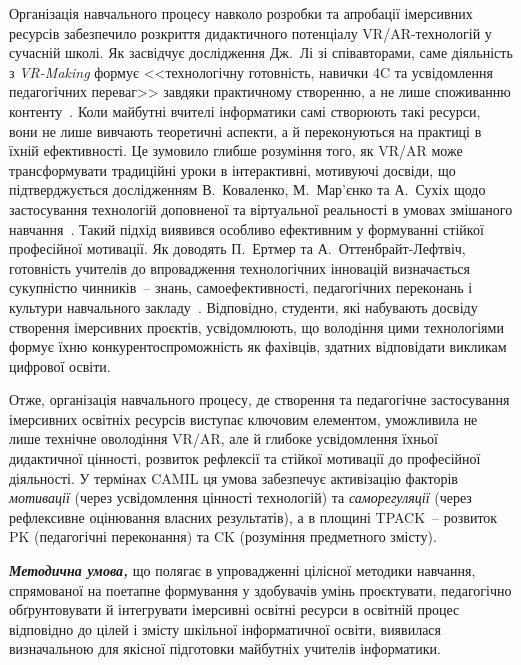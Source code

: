 Організація навчального процесу навколо розробки та апробації імерсивних ресурсів забезпечило розкриття дидактичного потенціалу VR/AR-технологій у сучасній школі. Як засвідчує дослідження Дж.~Лі зі співавторами, саме діяльність з \emph{VR-Making} формує <<технологічну готовність, навички 4C та усвідомлення педагогічних переваг>> завдяки практичному створенню, а не лише споживанню контенту~\cite{Lee2022VRMaking}. Коли майбутні вчителі інформатики самі створюють такі ресурси, вони не лише вивчають теоретичні аспекти, а й переконуються на практиці в їхній ефективності. Це зумовило глибше розуміння того, як VR/AR може трансформувати традиційні уроки в інтерактивні, мотивуючі досвіди, що підтверджується дослідженням В.~Коваленко, М.~Мар'єнко та А.~Сухіх щодо застосування технологій доповненої та віртуальної реальності в умовах змішаного навчання~\cite{Pinchuk2022AR}. Такий підхід виявився особливо ефективним у формуванні стійкої професійної мотивації. Як доводять П.~Ертмер та А.~Оттенбрайт-Лефтвіч, готовність учителів до впровадження технологічних інновацій визначається сукупністю чинників~-- знань, самоефективності, педагогічних переконань і культури навчального закладу~\cite{KInnovation2023}. Відповідно, студенти, які набувають досвіду створення імерсивних проєктів, усвідомлюють, що володіння цими технологіями формує їхню конкурентоспроможність як фахівців, здатних відповідати викликам цифрової освіти.

Отже, організація навчального процесу, де створення та педагогічне застосування імерсивних освітніх ресурсів виступає ключовим елементом, уможливила не лише технічне оволодіння VR/AR, але й глибоке усвідомлення їхньої дидактичної цінності, розвиток рефлексії та стійкої мотивації до професійної діяльності. У термінах CAMIL ця умова забезпечує активізацію факторів \emph{мотивації} (через усвідомлення цінності технологій) та \emph{саморегуляції} (через рефлексивне оцінювання власних результатів), а в площині TPACK~-- розвиток PK (педагогічні переконання) та CK (розуміння предметного змісту).

\emph{\textbf{Методична умова,}} що полягає в упровадженні цілісної методики навчання, спрямованої на поетапне формування у здобувачів умінь проєктувати, педагогічно обґрунтовувати й інтегрувати імерсивні освітні ресурси в освітній процес відповідно до цілей і змісту шкільної інформатичної освіти, виявилася визначальною для якісної підготовки майбутніх учителів інформатики.

